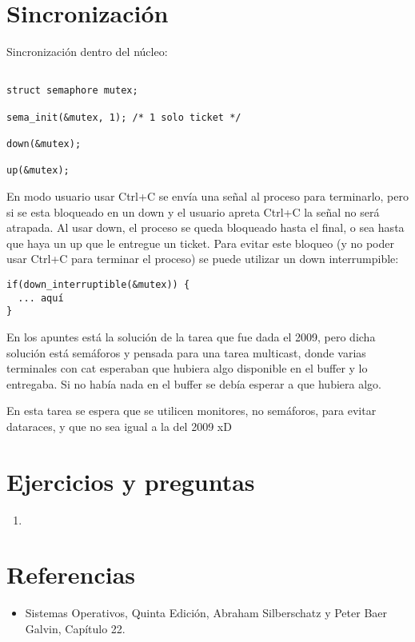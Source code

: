 \section{Sincronización}

Sincronización dentro del núcleo:

\begin{verbatim}

struct semaphore mutex;

sema_init(&mutex, 1); /* 1 solo ticket */

down(&mutex);

up(&mutex);

\end{verbatim}

En modo usuario usar Ctrl+C se envía una señal al proceso para terminarlo, pero si se esta bloqueado en un down y el usuario apreta Ctrl+C la señal no será atrapada. Al usar down, el proceso se queda bloqueado hasta el final, o sea hasta que haya un up que le entregue un ticket. Para evitar este bloqueo (y no poder usar Ctrl+C para terminar el proceso) se puede utilizar un down interrumpible:

\begin{verbatim}
if(down_interruptible(&mutex)) {
  ... aquí 
}
\end{verbatim}

En los apuntes está la solución de la tarea que fue dada el 2009, pero dicha solución está semáforos y pensada para una tarea multicast, donde varias terminales con cat esperaban que hubiera algo disponible en el buffer y lo entregaba. Si no había nada en el buffer se debía esperar a que hubiera algo.

En esta tarea se espera que se utilicen monitores, no semáforos, para evitar dataraces, y que no sea igual a la del 2009 xD

\section{Ejercicios y preguntas}
\begin{enumerate}
	\item 
\end{enumerate}

\section{Referencias}
\begin{itemize}
	\item Sistemas Operativos, Quinta Edición, Abraham Silberschatz y Peter Baer Galvin, Capítulo 22.
\end{itemize}
